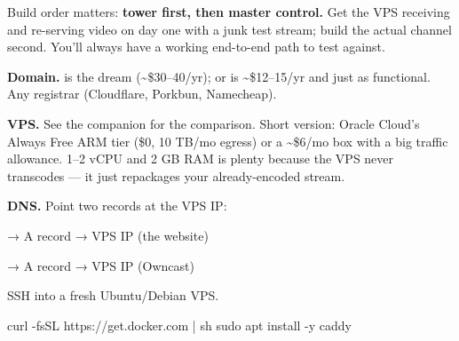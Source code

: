 \documentclass[fontpath=fonts/,logopath=logo/]{riposte-doc}
\begin{document}

Build order matters: \textbf{tower first, then master control.} Get the VPS receiving and re-serving video on day one with a junk test stream; build the actual channel second. You'll always have a working end-to-end path to test against.



\begin{ripnumbers}
\item \textbf{Domain.}  is the dream (\textasciitilde{}\$30–40/yr);  or  is \textasciitilde{}\$12–15/yr and just as functional. Any registrar (Cloudflare, Porkbun, Namecheap).
\item \textbf{VPS.} See the companion  for the comparison. Short version: Oracle Cloud's Always Free ARM tier (\$0, 10 TB/mo egress) or a \textasciitilde{}\$6/mo box with a big traffic allowance. 1–2 vCPU and 2 GB RAM is plenty because the VPS never transcodes — it just repackages your already-encoded stream.
\item \textbf{DNS.} Point two records at the VPS IP:
\begin{ripbullets}
\item {} → A record → VPS IP (the website)
\item {} → A record → VPS IP (Owncast)
\end{ripbullets}

\end{ripnumbers}




SSH into a fresh Ubuntu/Debian VPS.



\ripcodeopen
{}
\begin{ripcodeblock}
curl -fsSL https://get.docker.com | sh
sudo apt install -y caddy
\end{ripcodeblock}
\ripcodesizereset\ripcodeclose
\end{document}
